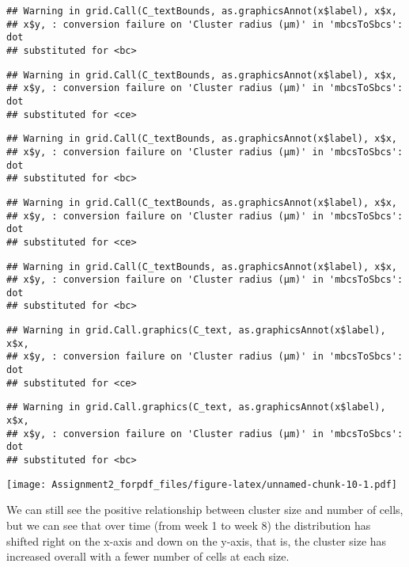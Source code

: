 \documentclass[]{article}
\begin{document}
\begin{verbatim}
## Warning in grid.Call(C_textBounds, as.graphicsAnnot(x$label), x$x,
## x$y, : conversion failure on 'Cluster radius (μm)' in 'mbcsToSbcs': dot
## substituted for <bc>
\end{verbatim}

\begin{verbatim}
## Warning in grid.Call(C_textBounds, as.graphicsAnnot(x$label), x$x,
## x$y, : conversion failure on 'Cluster radius (μm)' in 'mbcsToSbcs': dot
## substituted for <ce>
\end{verbatim}

\begin{verbatim}
## Warning in grid.Call(C_textBounds, as.graphicsAnnot(x$label), x$x,
## x$y, : conversion failure on 'Cluster radius (μm)' in 'mbcsToSbcs': dot
## substituted for <bc>
\end{verbatim}

\begin{verbatim}
## Warning in grid.Call(C_textBounds, as.graphicsAnnot(x$label), x$x,
## x$y, : conversion failure on 'Cluster radius (μm)' in 'mbcsToSbcs': dot
## substituted for <ce>
\end{verbatim}

\begin{verbatim}
## Warning in grid.Call(C_textBounds, as.graphicsAnnot(x$label), x$x,
## x$y, : conversion failure on 'Cluster radius (μm)' in 'mbcsToSbcs': dot
## substituted for <bc>
\end{verbatim}

\begin{verbatim}
## Warning in grid.Call.graphics(C_text, as.graphicsAnnot(x$label), x$x,
## x$y, : conversion failure on 'Cluster radius (μm)' in 'mbcsToSbcs': dot
## substituted for <ce>
\end{verbatim}

\begin{verbatim}
## Warning in grid.Call.graphics(C_text, as.graphicsAnnot(x$label), x$x,
## x$y, : conversion failure on 'Cluster radius (μm)' in 'mbcsToSbcs': dot
## substituted for <bc>
\end{verbatim}

\texttt{[image: Assignment2\_forpdf\_files/figure-latex/unnamed-chunk-10-1.pdf]}

We can still see the positive relationship between cluster size and
number of cells, but we can see that over time (from week 1 to week 8)
the distribution has shifted right on the x-axis and down on the y-axis,
that is, the cluster size has increased overall with a fewer number of
cells at each size.
\end{document}
